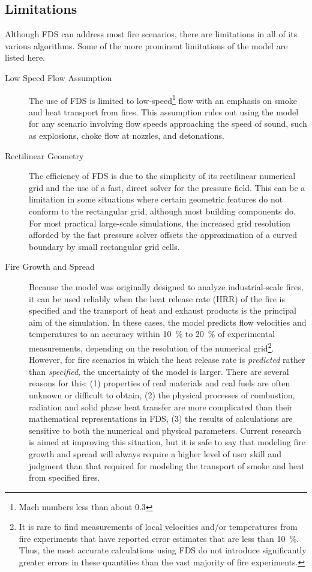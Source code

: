 \documentclass[11pt]{book}
\begin{document}
\subsection{Limitations}

Although FDS can address most fire scenarios, there are limitations in all of its various algorithms. Some of the more prominent limitations of the
model are listed here.
\begin{description}
\item[Low Speed Flow Assumption] The use of FDS is limited to low-speed\footnote{Mach numbers less than about 0.3} flow with an emphasis on smoke and heat transport from fires. This assumption rules out using the model for any scenario involving flow speeds approaching the speed of sound, such as explosions, choke flow at nozzles, and detonations.
\item[Rectilinear Geometry] The efficiency of FDS is due to the simplicity of its rectilinear numerical grid and the use of a fast, direct solver for the pressure field. This can be a limitation in some situations where certain geometric features do not conform to the rectangular grid, although most building components do. For most practical large-scale simulations, the increased grid resolution afforded by the fast pressure solver offsets the approximation of a curved boundary by small rectangular grid cells.
\item[Fire Growth and Spread] Because the model was originally designed to analyze industrial-scale fires, it can be used reliably when the heat release rate (HRR) of the fire is specified and the transport of heat and exhaust products is the principal aim of the simulation. In these cases, the model predicts flow velocities and temperatures to an accuracy within 10~\% to 20~\% of experimental measurements, depending on the resolution of the numerical grid\footnote{It is rare to find measurements of local velocities and/or temperatures from fire experiments that have reported error estimates that are less than 10~\%. Thus, the most accurate calculations using FDS do not introduce significantly greater errors in these quantities than the vast majority of fire experiments.}. However, for fire scenarios in which the heat release rate is {\em predicted} rather than {\em specified}, the uncertainty of the model is larger. There are several reasons for this: (1) properties of real materials and real fuels are often unknown or difficult to obtain, (2) the physical processes of combustion, radiation and solid phase heat transfer are more complicated than their mathematical representations in FDS, (3) the results of calculations are sensitive to both the numerical and physical parameters. Current research is aimed at improving this situation, but it is safe to say that modeling fire growth and spread will always require a higher level of user skill and judgment than that required for modeling the transport of smoke and heat from specified fires.

\end{description}
\end{document}
